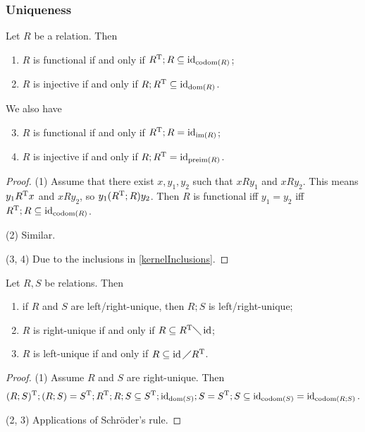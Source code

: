 \subsubsection{Uniqueness}
\begin{lemma} \label{relationTimesTransposeSubsetIdentity}
Let $R$ be a relation. Then
\begin{enumerate}
\item $R$ is functional \textup{if and only if} $R^{\mathrm{T}}; R \subseteq \operatorname{id}_{\operatorname{codom}(R)}$;
\item $R$ is injective \textup{if and only if} $R; R^{\mathrm{T}} \subseteq \operatorname{id}_{\operatorname{dom}(R)}$.
\end{enumerate}
We also have
\begin{enumerate} \setcounter{enumi}{2}
\item $R$ is functional \textup{if and only if} $R^{\mathrm{T}}; R = \operatorname{id}_{\operatorname{im}(R)}$;
\item $R$ is injective \textup{if and only if} $R; R^{\mathrm{T}} = \operatorname{id}_{\operatorname{preim}(R)}$.
\end{enumerate}
\end{lemma}
\begin{proof}
(1) Assume that there exist $x,y_1,y_2$ such that $xRy_1$ and $xRy_2$. This means $y_1R^{\mathrm{T}} x$ and $xRy_2$, so $y_1(R^{\mathrm{T}}; R) y_2$. Then $R$ is functional iff $y_1 = y_2$ iff $R^{\mathrm{T}}; R \subseteq \operatorname{id}_{\operatorname{codom}(R)}$.

(2) Similar.

(3, 4) Due to the inclusions in \ref{kernelInclusions}.
\end{proof}
\begin{corollary}
Let $R, S$ be relations. Then
\begin{enumerate}
\item if $R$ and $S$ are left/right-unique, then $R;S$ is left/right-unique;
\item $R$ is right-unique \textup{if and only if} $R \subseteq R^{\mathrm{T}} \diagdown \operatorname{id}$;
\item $R$ is left-unique \textup{if and only if} $R\subseteq \operatorname{id} \diagup R^{\mathrm{T}}$.
\end{enumerate}
\end{corollary}
\begin{proof}
(1) Assume $R$ and $S$ are right-unique. Then
\[ (R;S)^{\mathrm{T}}; (R;S) = S^{\mathrm{T}};R^{\mathrm{T}};R;S \subseteq S^{\mathrm{T}};\operatorname{id}_{\operatorname{dom}(S)};S = S^{\mathrm{T}};S \subseteq \operatorname{id}_{\operatorname{codom}(S)} = \operatorname{id}_{\operatorname{codom}(R;S)}. \]

(2, 3) Applications of Schröder's rule.
\end{proof}

